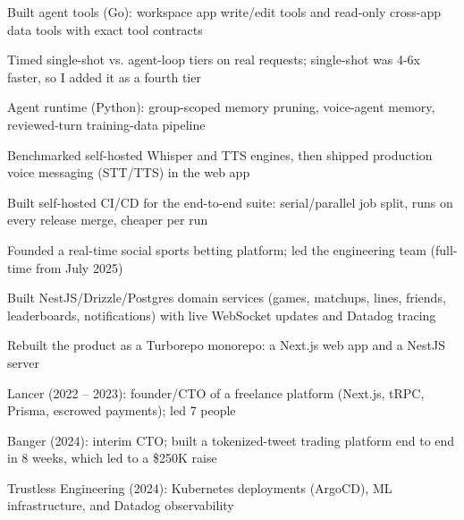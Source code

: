 \documentclass[print]{jack-resume}
\begin{document}
\begin{tightemize}
    \item Built agent tools (Go): workspace app write/edit tools and read-only cross-app data tools with exact tool contracts
    \item Timed single-shot vs. agent-loop tiers on real requests; single-shot was 4-6x faster, so I added it as a fourth tier
    \item Agent runtime (Python): group-scoped memory pruning, voice-agent memory, reviewed-turn training-data pipeline
    \item Benchmarked self-hosted Whisper and TTS engines, then shipped production voice messaging (STT/TTS) in the web app
    \item Built self-hosted CI/CD for the end-to-end suite: serial/parallel job split, runs on every release merge, cheaper per run
\end{tightemize}
\sectionsep

\begin{tightemize}
    \item Founded a real-time social sports betting platform; led the engineering team (full-time from July 2025)
    \item Built NestJS/Drizzle/Postgres domain services (games, matchups, lines, friends, leaderboards, notifications) with live WebSocket updates and Datadog tracing
    \item Rebuilt the product as a Turborepo monorepo: a Next.js web app and a NestJS server
\end{tightemize}
\sectionsep

\begin{tightemize}
    \item Lancer (2022 -- 2023): founder/CTO of a freelance platform (Next.js, tRPC, Prisma, escrowed payments); led 7 people
    \item Banger (2024): interim CTO; built a tokenized-tweet trading platform end to end in 8 weeks, which led to a \$250K raise
    \item Trustless Engineering (2024): Kubernetes deployments (ArgoCD), ML infrastructure, and Datadog observability
\end{tightemize}
\sectionsep
\end{document}
